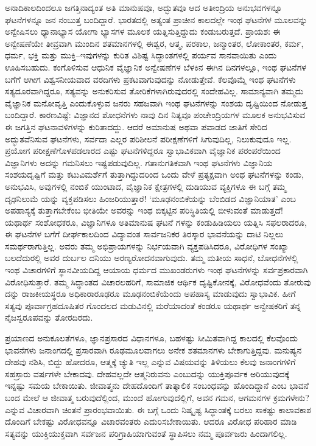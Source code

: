 ಅನಾದಿಕಾಲದಿಂದಲೂ ಜಗತ್ತಿನಾದ್ಯಂತ ಅತಿ ಮಾನುಷವೂ, ಅದ್ಭುತವೂ ಆದ ಅತೀಂದ್ರಿಯ ಅನುಭವಗಳನ್ನೂ ಘಟನೆಗಳನ್ನೂ ಜನ ನಂಬುತ್ತ ಬಂದಿದ್ದಾರೆ. ಭಾರತದಲ್ಲಿ ಅತ್ಯಂತ ಪ್ರಾಚೀನ ಕಾಲದಲ್ಲೇ ಇಂಥ ಘಟನೆಗಳ ಮೂಲವನ್ನು ಅನ್ವೇಷಿಸಲು ಧ್ಯಾನಾಭ್ಯಾಸ ಯೋಗಾ ಭ್ಯಾಸಗಳ ಮೂಲಕ ಯತ್ನಿಸುತ್ತಿದ್ದುದು ಕಂಡುಬರುತ್ತದೆ. ಪ್ರಾಯಶಃ ಈ ಅನ್ವೇಷಣೆಯೇ ತೀವ್ರವಾಗಿ ಮುಂದಿನ ಶತಮಾನಗಳಲ್ಲಿ ಈಶ್ವರ, ಆತ್ಮ, ಪರಕಾಲ, ಜನ್ಮಾಂತರ, ಲೋಕಾಂತರ, ಕರ್ಮ, ಧರ್ಮ, ಭಕ್ತಿ ಮತ್ತು ಮುಕ್ತಿ–ಇವುಗಳನ್ನು ಕುರಿತ ವಿಶಿಷ್ಟ ಸಿದ್ಧಾಂತಗಳಲ್ಲಿ ಪರ್ಯವ ಸಾನವಾಯಿತು ಎಂದು ಊಹಿಸಬಹುದು. ಕಂಗೊಳಿಸುವ ಆಧುನಿಕ ವೈಜ್ಞಾನಿಕ ಅನ್ವೇಷಣೆಗಳ ಬೆಳಕಿನ ಈಗಿನ ದಿನಗಳಲ್ಲೂ, ಇಂಥ ಘಟನೆಗಳ ಬಗೆಗೆ ಆಗೀಗ ವಿಶ್ವಸನೀಯವಾದ ವರದಿಗಳು ಪ್ರಕಟವಾಗುವುದನ್ನು ನೋಡುತ್ತೇವೆ. ಕೆಲವೊಮ್ಮೆ ಇಂಥ ಘಟನೆಗಳು ಸತ್ಯದೂರವಾಗಿದ್ದರೂ, ಸತ್ಯವನ್ನು ಅನುಕರಿಸುವ ತೋರಿಕೆಗಳಾಗಿರುವುದರಲ್ಲಿ ಸಂದೇಹವಿಲ್ಲ. ಸಾಮಾನ್ಯವಾಗಿ ತಮ್ಮದು ವೈಜ್ಞಾನಿಕ ಮನೋವೃತ್ತಿ ಎಂದುಕೊಳ್ಳುವ ಜನರು ಸಹಜವಾಗಿ ಇಂಥ ಘಟನೆಗಳನ್ನು ಸಂಶಯ ದೃಷ್ಟಿಯಿಂದ ನೋಡುತ್ತ ಬಂದಿದ್ದಾರೆ. ಕಾರಣವಿಷ್ಟೆ: ವಿಜ್ಞಾನದ ಶೋಧನೆಗಳು ನಾವು ದಿನ ನಿತ್ಯವೂ ಪಂಚೇಂದ್ರಿಯಗಳ ಮೂಲಕ ಅನುಭವಿಸುವ ಈ ಜಗತ್ತಿನ ಘಟನಾವಳಿಗಳನ್ನು ಕುರಿತಾದದ್ದು. ಆದರೆ ಅಮಾನುಷ ಅಥವಾ ಪವಾಡದ ಜಾತಿಗೆ ಸೇರಿದ ಅದ್ಭುತವೆನಿಸುವ ಘಟನೆಗಳು, ಸರ್ವದಾ ಎಲ್ಲರ ಪರಿಶೀಲನೆ ಪರೀಕ್ಷಣೆಗಳಿಗೆ ಸಿಗುವುದಿಲ್ಲ, ನಿಲುಕುವುದೂ ಇಲ್ಲ. ಪ್ರಯೋಗ ಪರೀಕ್ಷಣೆಗೊಳಪಡಲಾರದ ಎಷ್ಟು ಘಟನೆಗಳಿದ್ದರೂ ಸ್ವಾಭಾವಿಕವಾಗಿ ವೈಜ್ಞಾನಿಕ ಪರಂಪರೆಯಿಂದ ವಿಜ್ಞಾನಿಗಳು ಅದನ್ನು ಗಮನಿಸಲು ಇಷ್ಟಪಡುವುದಿಲ್ಲ. ಗತಾನುಗತಿಕವಾಗಿ ಇಂಥ ಘಟನೆಗಳು ವಿಜ್ಞಾನಿಯ ಸಂಶಯದೃಷ್ಟಿಗೆ ಮತ್ತು ಕಟುವಿಮರ್ಶೆಗೆ ತುತ್ತಾಗಿದ್ದುದರಿಂದ ಒಂದು ವೇಳೆ ಪ್ರತ್ಯಕ್ಷವಾಗಿ ಅಂಥ ಘಟನೆಗಳನ್ನು ಕಂಡು, ಅನುಭವಿಸಿ, ಅವುಗಳಲ್ಲಿ ನಂಬಿಕೆ ಯುಂಟಾದ, ವೈಜ್ಞಾನಿಕ ಕ್ಷೇತ್ರಗಳಲ್ಲಿ ದುಡಿಯುವ ವ್ಯಕ್ತಿಗಳೂ ಈ ಬಗ್ಗೆ ತಮ್ಮ ದೃಢನಿಲುಮೆ ಯನ್ನು ವ್ಯಕ್ತಪಡಿಸಲು ಹಿಂಜರಿಯುತ್ತಾರೆ! ‘ಮೂಢನಂಬಿಕೆಯನ್ನು ಬೆಂಬಿಡದ ವಿಜ್ಞಾನಿಯಾತ’ ಎಂಬ ಅಪಹಾಸ್ಯಕ್ಕೆ ತುತ್ತಾಗಬೇಕೆಂಬ ಭೀತಿಯೇ ಅವರನ್ನು ಇಂಥ ಬಿಕ್ಕಟ್ಟಿನ ಪರಿಸ್ಥಿತಿಯಲ್ಲಿ ಬೀಳುವಂತೆ ಮಾಡುತ್ತದೆ! ಯಥಾರ್ಥ ಸಂಶೋಧಕರೂ, ವಿಜ್ಞಾನಿಗಳೂ ಅತಿಮಾನುಷ ಘಟನೆ ಗಳನ್ನು ಕಂಡುಹಿಡಿಯಲು ಯತ್ನಿಸಿ ಸಫಲರಾದರೂ, ಈ ಘಟನೆಗಳ ಬಗೆಗೆ ದೀರ್ಘಕಾಲದಿಂದ ವಿದ್ಯಾವಂತ ಸಾರ್ವಜನಿಕರ ತಿರಸ್ಕಾರ ಭಾವನೆಯನ್ನು ದಾಟಿ ನಿಲ್ಲಲು ಸಮರ್ಥರಾಗುತ್ತಿಲ್ಲ. ಅವರು ತಮ್ಮ ಅಭಿಪ್ರಾಯಗಳನ್ನು ನಿರ್ಭಯವಾಗಿ ವ್ಯಕ್ತಪಡಿಸಿದರೂ, ವಿರೋಧಿಗಳ ಸಂಖ್ಯಾ ಬಲದೆದುರಲ್ಲಿ ಅವರ ದುರ್ಬಲ ದನಿಯು ಅರಣ್ಯರೋದನವಾಗುವುದು. ತಮ್ಮ ಮತೀಯ ಸಾಧನೆ, ಬೋಧನೆಗಳಲ್ಲಿ ಇಂಥ ವಿಚಾರಗಳಿಗೆ ಸ್ಥಾನವೀಯದಿದ್ದ ಆಯಾಯ ಧರ್ಮದ ಮುಖಂಡರುಗಳು ಇಂಥ ಘಟನೆಗಳನ್ನು ಸರ್ವಪ್ರಕಾರವಾಗಿ ವಿರೋಧಿಸುತ್ತಾರೆ. ತಮ್ಮ ಸಿದ್ಧಾಂತದ ವಿಚಾರಲಹರಿಗೆ, ಸಾಮಾಜಿಕ ಆರ್ಥಿಕ ದೃಷ್ಟಿಕೋನಕ್ಕೆ, ವಿರೋಧವೆಂದು ತೋರುವು ದನ್ನು ರಾಜಕೀಯಸ್ಥರೂ ಅಧಿಕಾರಾರೂಢರೂ ಮೂಢನಂಬಿಕೆಯೆಂದು ಅಪಹಾಸ್ಯ ಮಾಡುವುದು ಸ್ವಾಭಾವಿಕ. ಹೀಗೆ ಸತ್ಯವು ಪೂರ್ವಾಗ್ರಹದೂಷಿತರ ಗೊಂದಲದ ಮಡುವಿನಲ್ಲಿ ಮರೆಯಾದಂತೆ ಕಂಡರೂ ಯಥಾರ್ಥ ಅನ್ವೇಷಕರಿಗೆ ತನ್ನ ನೈಜಸ್ವರೂಪವನ್ನು ತೋರದಿರದು.

ಪ್ರಯಾಣದ ಅನುಕೂಲತೆಗಳೂ, ಜ್ಞಾನಪ್ರಸಾರದ ವಿಧಾನಗಳೂ, ಬಹಳಷ್ಟು ಸೀಮಿತವಾಗಿದ್ದ ಕಾಲದಲ್ಲಿ ಕೆಲವೊಂದು ಭಾವನೆಗಳು ಜನಾಂಗದಲ್ಲಿ ಪ್ರಸಾರವಾಗಿ ರೂಢಮೂಲವಾಗಲು ಅನೇಕ ಶತಮಾನಗಳು ಬೇಕಾಗುತ್ತಿದ್ದವು. ಮನುಷ್ಯನ ದೇಹವು ನಶಿಸಿ, ಬಿದ್ದು ಹೋದರೂ, ಆತ್ಮಕ್ಕೆ ಚ್ಯುತಿ ಇಲ್ಲ ಎನ್ನುವ ವಿಷಯವನ್ನು ತಿಳಿಯಲು ಕೆಲವು ಜನಾಂಗಗಳಿಗೆ ಸಹಸ್ರಾರು ವರ್ಷಗಳೇ ಬೇಕಾದವು. ದೇಹವಲ್ಲದೇ ಆತ್ಮನಿರುವನು ಎಂಬುದನ್ನು ಯುಕ್ತಿಪೂರ್ವಕ ಅರಿಯುವುದಕ್ಕೆ ಇನ್ನಷ್ಟು ಸಮಯ ಬೇಕಾಯಿತು. ಜೀವಾತ್ಮನು ದೇಹದೊಂದಿಗೆ ತಾತ್ಕಾಲಿಕ ಸಂಬಂಧವನ್ನು ಹೊಂದಿದ್ದಾನೆ ಎಂಬ ಭಾವನೆ ಬಂದ ಮೇಲೆ ಆ ಜೀವಾತ್ಮ ಬರುವುದೆಲ್ಲಿಂದ, ಮುಂದೆ ಹೋಗುವುದೆಲ್ಲಿಗೆ, ಅವನ ಗಮನ, ಆಗಮನಗಳ ಕ್ರಮಗಳೇನು? ಎನ್ನುವ ವಿಚಾರವಾಗಿ ಚಿಂತನೆ ಪ್ರಾರಂಭವಾಯಿತು. ಈ ಬಗ್ಗೆ ಒಂದು ನಿಷ್ಕೃಷ್ಟ ಸಿದ್ಧಾಂತಕ್ಕೆ ಬರಲು ಸಾಕಷ್ಟು ಕಾಲಾವಕಾಶ ದೊಂದಿಗೆ ಬೇಕಷ್ಟು ವಿರೋಧವನ್ನೂ ವಿಚಾರವಂತರು ಎದುರಿಸಬೇಕಾಯಿತು. ಆದರೂ ವಿರೋಧ ಪರಿಹಾರ ಮಾಡಿ ಸತ್ಯವನ್ನು ಯುಕ್ತಿಯುಕ್ತವಾಗಿ ಸರ್ವಜನ ಪರಿಗ್ರಾಹಿಯಾಗುವಂತೆ ಸ್ಥಾಪಿಸಲು ನಮ್ಮ ಪೂರ್ವಜರು ಹಿಂದಾಗಲಿಲ್ಲ.

